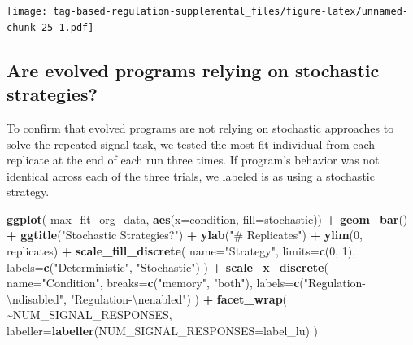 \documentclass[
]{book}
\newenvironment{Shaded}{\begin{snugshade}}{\end{snugshade}}
\newcommand{\CharTok}[1]{\textcolor[rgb]{0.31,0.60,0.02}{#1}}
\newcommand{\DataTypeTok}[1]{\textcolor[rgb]{0.13,0.29,0.53}{#1}}
\newcommand{\DecValTok}[1]{\textcolor[rgb]{0.00,0.00,0.81}{#1}}
\newcommand{\KeywordTok}[1]{\textcolor[rgb]{0.13,0.29,0.53}{\textbf{#1}}}
\newcommand{\NormalTok}[1]{#1}
\newcommand{\OperatorTok}[1]{\textcolor[rgb]{0.81,0.36,0.00}{\textbf{#1}}}
\newcommand{\StringTok}[1]{\textcolor[rgb]{0.31,0.60,0.02}{#1}}
\begin{document}
\texttt{[image: tag-based-regulation-supplemental\_files/figure-latex/unnamed-chunk-25-1.pdf]}

\hypertarget{are-evolved-programs-relying-on-stochastic-strategies}{%
\subsection{Are evolved programs relying on stochastic strategies?}\label{are-evolved-programs-relying-on-stochastic-strategies}}

To confirm that evolved programs are not relying on stochastic approaches to solve the repeated signal task,
we tested the most fit individual from each replicate at the end of each run three times.
If program's behavior was not identical across each of the three trials, we labeled is as using a stochastic strategy.

\begin{Shaded}
\begin{Highlighting}[]
\KeywordTok{ggplot}\NormalTok{( max\_fit\_org\_data, }\KeywordTok{aes}\NormalTok{(}\DataTypeTok{x=}\NormalTok{condition, }\DataTypeTok{fill=}\NormalTok{stochastic)) }\OperatorTok{+}
\StringTok{  }\KeywordTok{geom\_bar}\NormalTok{() }\OperatorTok{+}
\StringTok{  }\KeywordTok{ggtitle}\NormalTok{(}\StringTok{"Stochastic Strategies?"}\NormalTok{) }\OperatorTok{+}
\StringTok{  }\KeywordTok{ylab}\NormalTok{(}\StringTok{"\# Replicates"}\NormalTok{) }\OperatorTok{+}
\StringTok{  }\KeywordTok{ylim}\NormalTok{(}\DecValTok{0}\NormalTok{, replicates) }\OperatorTok{+}
\StringTok{  }\KeywordTok{scale\_fill\_discrete}\NormalTok{(}
    \DataTypeTok{name=}\StringTok{"Strategy"}\NormalTok{,}
    \DataTypeTok{limits=}\KeywordTok{c}\NormalTok{(}\DecValTok{0}\NormalTok{, }\DecValTok{1}\NormalTok{),}
    \DataTypeTok{labels=}\KeywordTok{c}\NormalTok{(}\StringTok{"Deterministic"}\NormalTok{, }\StringTok{"Stochastic"}\NormalTok{)}
\NormalTok{  ) }\OperatorTok{+}
\StringTok{  }\KeywordTok{scale\_x\_discrete}\NormalTok{(}
    \DataTypeTok{name=}\StringTok{"Condition"}\NormalTok{,}
    \DataTypeTok{breaks=}\KeywordTok{c}\NormalTok{(}\StringTok{"memory"}\NormalTok{, }\StringTok{"both"}\NormalTok{),}
    \DataTypeTok{labels=}\KeywordTok{c}\NormalTok{(}\StringTok{"Regulation{-}}\CharTok{\textbackslash{}n}\StringTok{disabled"}\NormalTok{, }\StringTok{"Regulation{-}}\CharTok{\textbackslash{}n}\StringTok{enabled"}\NormalTok{)}
\NormalTok{  ) }\OperatorTok{+}
\StringTok{  }\KeywordTok{facet\_wrap}\NormalTok{(}
    \OperatorTok{\textasciitilde{}}\NormalTok{NUM\_SIGNAL\_RESPONSES,}
    \DataTypeTok{labeller=}\KeywordTok{labeller}\NormalTok{(}\DataTypeTok{NUM\_SIGNAL\_RESPONSES=}\NormalTok{label\_lu)}
\NormalTok{  )}
\end{Highlighting}
\end{Shaded}
\end{document}
